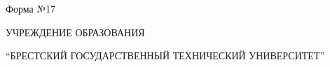 \documentclass[12pt, А4, twoside]{article} %
\begin{document}

\begin{FlushRight}{\fontsize{11}{13.75}\selectfont \cyrillicfont
        Форма №17
} \end{FlushRight}

\begin{Center}  {\fontsize{14}{17.5}\selectfont \cyrillicfont 
        УЧРЕЖДЕНИЕ ОБРАЗОВАНИЯ
        \par %
        “БРЕСТСКИЙ ГОСУДАРСТВЕННЫЙ ТЕХНИЧЕСКИЙ УНИВЕРСИТЕТ”
} \end{Center}
\end{document}
